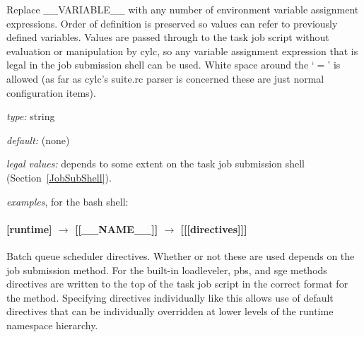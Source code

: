 Replace \_\_VARIABLE\_\_ with any number of environment variable
assignment expressions.
Order of definition is preserved so values can refer to previously
defined variables. Values are passed through to the task job script
without evaluation or manipulation by cylc, so any variable assignment
expression that is legal in the job submission shell can be used. 
White space around the `$=$' is allowed (as far as cylc's suite.rc 
parser is concerned these are just normal configuration items).

\begin{myitemize}
\item {\em type:} string
\item {\em default:} (none)
\item {\em legal values:} depends to some extent on the task job
    submission shell (Section~\ref{JobSubShell}). 
\item {\em examples}, for the bash shell: 
\end{myitemize}

\paragraph[{[[[}directives{]]]}]{[runtime] $\rightarrow$ [[\_\_NAME\_\_]] $\rightarrow$ [[[directives]]]}

Batch queue scheduler directives.  Whether or not these are used depends
on the job submission method. For the built-in loadleveler, pbs, and sge
methods directives are written to the top of the task job script in
the correct format for the method. Specifying directives individually
like this allows use of default directives that can be individually
overridden at lower levels of the runtime namespace hierarchy.

